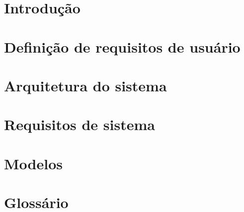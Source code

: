 \documentclass[11pt, a4paper]{article}
\let\oldsection\section
\renewcommand{\section}{\leftskip=0.0cm\oldsection}
\begin{document}


\tableofcontents
\pagebreak

\section{Introdução}

\section{Definição de requisitos de usuário}

\section{Arquitetura do sistema}

\section{Requisitos de sistema}

\section{Modelos}


\section{Glossário}
\end{document}
